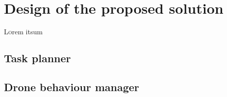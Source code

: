 \chapter{Design of the proposed solution}
\label{ch:DesignOfTheProposedSolution}
\lettrine[lraise=-0.1, lines=2, loversize=0.2]{L}{o}rem itsum

\section{Task planner}
\label{sec:TaskPlanner}


\section{Drone behaviour manager}
\label{sec:DroneBehavioutManager}

